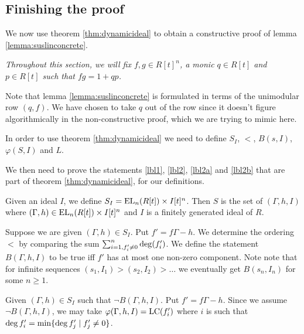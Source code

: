 \subsection{Finishing the proof}

We now use theorem \ref{thm:dynamicideal} to obtain a constructive proof of lemma \ref{lemma:suslinconcrete}.

\emph{
  Throughout this section, we will fix $f,g \in R[t]^n$, a monic $q \in R[t]$ and $p \in R[t]$ such that $fg = 1 + qp$.
}

\begin{remark}
Note that lemma \ref{lemma:suslinconcrete} is formulated in terms of the unimodular row $(q,f)$.
We have chosen to take $q$ out of the row since it doesn't figure algorithmically in the non-constructive proof, which we are trying to mimic here.
\end{remark}

In order to use theorem \ref{thm:dynamicideal} we need to define $S_I$, $<$, $B(s,I)$, $\varphi(S,I)$ and $L$.

We then need to prove the statements \ref{lbl1}, \ref{lbl2}, \ref{lbl2a} and \ref{lbl2b} that
are part of theorem \ref{thm:dynamicideal}, for our definitions.

\begin{definition}[$S_I$ and $S$]
Given an ideal $I$, we define $S_I = \text{EL}_n(R[t]) \times I[t]^n$.
Then $S$ is the set of $(\Gamma,h,I)$ where $(\Gamma,h) \in \text{EL}_n(R[t]) \times I[t]^n$ and $I$ is a finitely generated ideal of $R$.
\end{definition}

\begin{definition}[$<$ and $B(s,I)$]
Suppose we are given $(\Gamma,h) \in S_I$.
Put $f' = f \Gamma - h$.
We determine the ordering $<$ by comparing the sum $\sum_{i=1, f'_i \neq 0}^n \deg(f'_i)$.
We define the statement $B(\Gamma, h, I)$ to be true iff $f'$ has at most one non-zero component.
Note note that for infinite sequences $(s_1, I_1) > (s_2, I_2) > \dots$ we eventually get $B(s_n,I_n)$ for some $n\geq 1$.
\end{definition}

\begin{definition}[$\varphi$]
  Given $(\Gamma, h) \in S_I$ such that $\neg B(\Gamma,h,I)$.
  Put $f' = f \Gamma - h$.
  Since we assume $\neg B(\Gamma,h,I)$, we may take $\varphi(\Gamma,h,I) = \text{LC}(f'_i)$ where $i$ is such that $\deg f'_i = \min \{\deg f'_j \mid f'_j \neq 0\}$.
\end{definition}

